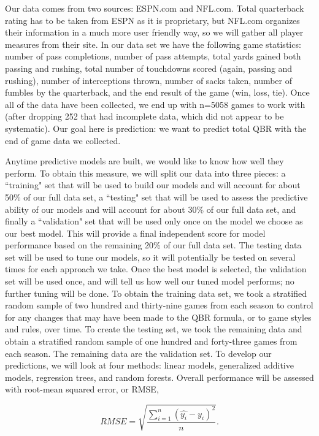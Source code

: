 \documentclass[12pt]{article}\usepackage[]{graphicx}\usepackage[]{color}
\begin{document}
Our data comes from two sources: ESPN.com and NFL.com. Total quarterback rating has to be taken from ESPN as it is proprietary, but NFL.com organizes their information in a much more user friendly way, so we will gather all player measures from their site. In our data set we have the following game statistics: number of pass completions, number of pass attempts, total yards gained both passing and rushing, total number of touchdowns scored (again, passing and rushing), number of interceptions thrown, number of sacks taken, number of fumbles by the quarterback, and the end result of the game (win, loss, tie). Once all of the data have been collected, we end up with n=5058 games to work with (after dropping 252 that had incomplete data, which did not appear to be systematic). Our goal here is prediction: we want to predict total QBR with the end of game data we collected. 

Anytime predictive models are built, we would like to know how well they perform. To obtain this measure, we will split our data into three pieces: a ``training" set that will be used to build our models and will account for about 50\% of our full data set, a ``testing" set that will be used to assess the predictive ability of our models and will account for about 30\% of our full data set, and finally a ``validation" set that will be used only once on the model we choose as our best model. This will provide a final independent score for model performance based on the remaining 20\% of our full data set. The testing data set will be used to tune our models, so it will potentially be tested on several times for each approach we take. Once the best model is selected, the validation set will be used once, and will tell us how well our tuned model performs; no further tuning will be done. To obtain the training data set, we took a stratified random sample of two hundred and thirty-nine games from each season to control for any changes that may have been made to the QBR formula, or to game styles and rules, over time. To create the testing set, we took the remaining data and obtain a stratified random sample of one hundred and forty-three games from each season. The remaining data are the validation set. To develop our predictions, we will look at four methods: linear models, generalized additive models, regression trees, and random forests. Overall performance will be assessed with root-mean squared error, or RMSE,

\begin{equation*}
RMSE=\sqrt{\frac{\sum_{i=1}^n(\hat{y_{i}}-y_{i})^{2}}{n}}.
\end{equation*}
\end{document}
